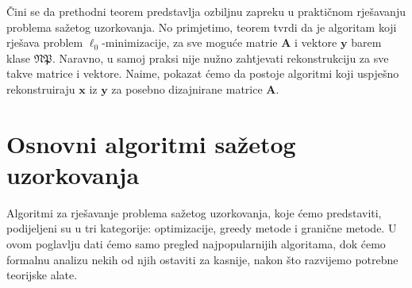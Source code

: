 \documentclass[a4paper,twoside,12pt]{memoir} %
\newcommand{\vect}[1]{\mathbf{#1}}
\renewcommand{\vec}{\vect}
\begin{document}
\v{C}ini se da prethodni teorem predstavlja ozbiljnu zapreku u prakti\v{c}nom rje\v{s}avanju problema sa\v{z}etog uzorkovanja. No primjetimo, teorem tvrdi da je algoritam koji rje\v{s}ava problem $\ell_0$-minimizacije, za sve mogu\'ce matrie $\vec A$ i vektore $\vec y$ barem klase $\mathfrak{NP}$. Naravno, u samoj praksi nije nu\v{z}no zahtjevati rekonstrukciju za sve takve matrice i vektore. Naime, pokazat \'cemo da postoje algoritmi koji uspje\v{s}no rekonstruiraju $\vec x$ iz $\vec y$ za posebno dizajnirane matrice $\vec A$.




\chapter[Osnovni algoritmi sa\v{z}etog uzorkovanja][Osnovni algoritmi sa\v{z}etog uzorkovanja]{Osnovni algoritmi sa\v{z}etog uzorkovanja}
Algoritmi za rje\v{s}avanje problema sa\v{z}etog uzorkovanja, koje \'cemo predstaviti, podijeljeni su u tri kategorije: optimizacije, greedy metode i grani\v{c}ne metode. U ovom poglavlju dati \'cemo samo pregled najpopularnijih algoritama, dok \'cemo formalnu analizu nekih od njih ostaviti za kasnije, nakon \v{s}to razvijemo potrebne teorijske alate.
\end{document}
